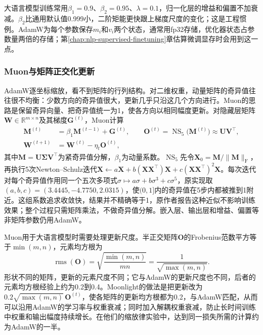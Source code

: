 大语言模型训练常用$\beta_1=0.9$、$\beta_2=0.95$、$\lambda=0.1$，归一化层的增益和偏置不加衰减。$\beta_2$比通用默认值0.999小，二阶矩能更快跟上梯度尺度的变化；这是工程惯例。AdamW为每个参数保存$m_i$和$v_i$两个状态，通常用fp32存储，优化器状态占参数量两倍的存储；第\ref{chap:nlp-supervised-finetuning}章估算微调显存时会用到这一点。

\subsubsection{Muon与矩阵正交化更新}
\label{sec:nlp-llm-muon}

AdamW逐坐标缩放，看不到矩阵的行列结构。对二维权重，动量矩阵的奇异值往往很不均衡：少数方向的奇异值很大，更新几乎只沿这几个方向进行。Muon的思路是保留奇异向量、把奇异值统一为1，使各方向以相同幅度更新。对隐藏层矩阵$\bm W\in\mathbb R^{m\times n}$及其梯度$\bm G^{(t)}$，Muon计算
\begin{equation}
 \begin{aligned}
 \bm M^{(t)}&=\beta_1\bm M^{(t-1)}+\bm G^{(t)},\qquad
 \bm O^{(t)}=\operatorname{NS}_5\bigl(\bm M^{(t)}\bigr)\approx\bm U\bm V^{\top},\\
 \bm W^{(t+1)}&=\bm W^{(t)}-\eta_t\bm O^{(t)},
 \end{aligned}
 \label{eq:nlp-llm-muon}
\end{equation}
其中$\bm M=\bm U\bm\Sigma\bm V^{\top}$为紧奇异值分解，$\beta_1$为动量系数。$\operatorname{NS}_5$先令$\bm X_0=\bm M/\lVert\bm M\rVert_{\mathrm F}$，再执行5次Newton--Schulz迭代$\bm X\gets a\bm X+b(\bm X\bm X^{\top})\bm X+c(\bm X\bm X^{\top})^2\bm X$。每次迭代对每个奇异值作用同一个五次多项式$\sigma\mapsto a\sigma+b\sigma^3+c\sigma^5$，原实现取$(a,b,c)=(3.4445,-4.7750,2.0315)$，使$(0,1]$内的奇异值在5步内都被推到1附近。这组系数追求收敛快，结果并不精确等于1，原作者报告这种近似不影响训练效果；整个过程只需矩阵乘法，不做奇异值分解。嵌入层、输出层和增益、偏置等非矩阵参数仍用AdamW。

Muon用于大语言模型时需要处理更新尺度。半正交矩阵$\bm O$的Frobenius范数平方等于$\min(m,n)$，元素均方根为
\begin{equation*}
 \operatorname{rms}(\bm O)=\sqrt{\frac{\min(m,n)}{mn}}=\frac{1}{\sqrt{\max(m,n)}}.
\end{equation*}
形状不同的矩阵，更新的元素尺度不同；它与AdamW的更新尺度也不同，后者的元素均方根经验上约为0.2到0.4。Moonlight的做法是把更新改为$0.2\sqrt{\max(m,n)}\,\bm O^{(t)}$，使各矩阵的更新均方根都为0.2，与AdamW匹配，从而可以沿用AdamW的学习率与权重衰减；同时加入解耦权重衰减，防止长时间训练中权重和输出幅度持续增长。在他们的缩放律实验中，达到同一损失所需的计算约为AdamW的一半。

